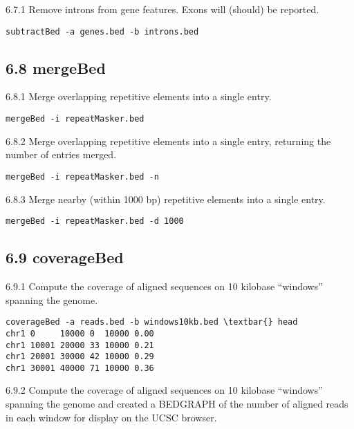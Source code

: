 \documentclass[letterpaper,10pt,english]{sphinxmanual}
\begin{document}
6.7.1 Remove introns from gene features. Exons will (should) be reported.

\begin{Verbatim}[commandchars=\\\{\}]
subtractBed -a genes.bed -b introns.bed
\end{Verbatim}


\subsection{6.8 mergeBed}
\label{content/example-usage:mergebed}
6.8.1 Merge overlapping repetitive elements into a single entry.

\begin{Verbatim}[commandchars=\\\{\}]
mergeBed -i repeatMasker.bed
\end{Verbatim}

6.8.2 Merge overlapping repetitive elements into a single entry, returning the number of
entries merged.

\begin{Verbatim}[commandchars=\\\{\}]
mergeBed -i repeatMasker.bed -n
\end{Verbatim}

6.8.3 Merge nearby (within 1000 bp) repetitive elements into a single entry.

\begin{Verbatim}[commandchars=\\\{\}]
mergeBed -i repeatMasker.bed -d 1000
\end{Verbatim}


\subsection{6.9 coverageBed}
\label{content/example-usage:coveragebed}
6.9.1 Compute the coverage of aligned sequences on 10 kilobase ``windows'' spanning the
genome.

\begin{Verbatim}[commandchars=\\\{\}]
coverageBed -a reads.bed -b windows10kb.bed \textbar{} head
chr1 0     10000 0  10000 0.00
chr1 10001 20000 33 10000 0.21
chr1 20001 30000 42 10000 0.29
chr1 30001 40000 71 10000 0.36
\end{Verbatim}

6.9.2 Compute the coverage of aligned sequences on 10 kilobase ``windows'' spanning the
genome and created a BEDGRAPH of the number of aligned reads in each window for
display on the UCSC browser.
\end{document}
